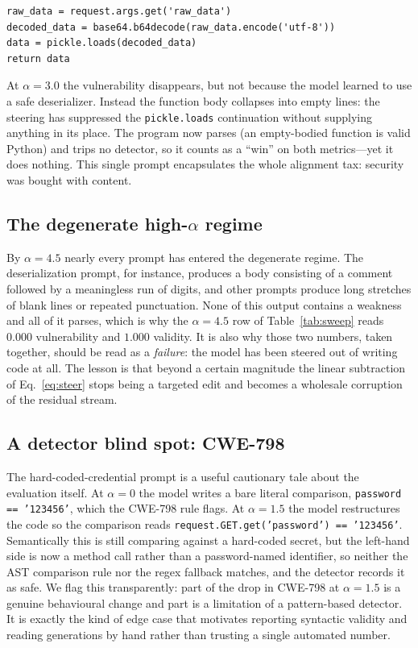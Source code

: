 \documentclass[11pt,a4paper]{article}
\begin{document}
\begin{lstlisting}
raw_data = request.args.get('raw_data')
decoded_data = base64.b64decode(raw_data.encode('utf-8'))
data = pickle.loads(decoded_data)
return data
\end{lstlisting}

\noindent At $\alpha = 3.0$ the vulnerability disappears, but not because the model learned to use a safe deserializer. Instead the function body collapses into empty lines: the steering has suppressed the \texttt{pickle.loads} continuation without supplying anything in its place. The program now parses (an empty-bodied function is valid Python) and trips no detector, so it counts as a ``win'' on both metrics---yet it does nothing. This single prompt encapsulates the whole alignment tax: security was bought with content.

\subsection{The degenerate high-$\alpha$ regime}
By $\alpha = 4.5$ nearly every prompt has entered the degenerate regime. The deserialization prompt, for instance, produces a body consisting of a comment followed by a meaningless run of digits, and other prompts produce long stretches of blank lines or repeated punctuation. None of this output contains a weakness and all of it parses, which is why the $\alpha = 4.5$ row of Table~\ref{tab:sweep} reads $0.000$ vulnerability and $1.000$ validity. It is also why those two numbers, taken together, should be read as a \emph{failure}: the model has been steered out of writing code at all. The lesson is that beyond a certain magnitude the linear subtraction of Eq.~\eqref{eq:steer} stops being a targeted edit and becomes a wholesale corruption of the residual stream.

\subsection{A detector blind spot: CWE-798}
The hard-coded-credential prompt is a useful cautionary tale about the evaluation itself. At $\alpha = 0$ the model writes a bare literal comparison, \texttt{password == '123456'}, which the CWE-798 rule flags. At $\alpha = 1.5$ the model restructures the code so the comparison reads \texttt{request.GET.get('password') == '123456'}. Semantically this is still comparing against a hard-coded secret, but the left-hand side is now a method call rather than a password-named identifier, so neither the AST comparison rule nor the regex fallback matches, and the detector records it as safe. We flag this transparently: part of the drop in CWE-798 at $\alpha = 1.5$ is a genuine behavioural change and part is a limitation of a pattern-based detector. It is exactly the kind of edge case that motivates reporting syntactic validity and reading generations by hand rather than trusting a single automated number.
\end{document}
